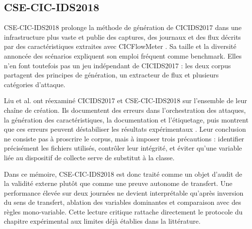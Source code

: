 
\subsection{CSE-CIC-IDS2018}

CSE-CIC-IDS2018 prolonge la méthode de génération de CICIDS2017 dans une
infrastructure plus vaste et publie des captures, des journaux et des flux décrits par
des caractéristiques extraites avec CICFlowMeter
\cite{sharafaldin2018cicids,cic2018csecicids}. Sa taille et la diversité annoncée des
scénarios expliquent son emploi fréquent comme benchmark. Elles n'en font toutefois pas
un jeu indépendant de CICIDS2017 : les deux corpus partagent des principes de génération,
un extracteur de flux et plusieurs catégories d'attaque.

Liu et al. ont réexaminé CICIDS2017 et CSE-CIC-IDS2018 sur l'ensemble de leur chaîne de
création. Ils documentent des erreurs dans l'orchestration des attaques, la génération
des caractéristiques, la documentation et l'étiquetage, puis montrent que ces erreurs
peuvent déstabiliser les résultats expérimentaux \cite{liu2022error}. Leur conclusion ne
consiste pas à proscrire le corpus, mais à imposer trois précautions : identifier
précisément les fichiers utilisés, contrôler leur intégrité, et éviter qu'une variable
liée au dispositif de collecte serve de substitut à la classe.

Dans ce mémoire, CSE-CIC-IDS2018 est donc traité comme un objet d'audit de la validité
externe plutôt que comme une preuve autonome de transfert. Une performance élevée sur
deux journées ne devient interprétable qu'après inversion du sens de transfert, ablation
des variables dominantes et comparaison avec des règles mono-variable. Cette lecture
critique rattache directement le protocole du chapitre expérimental aux limites déjà
établies dans la littérature.

